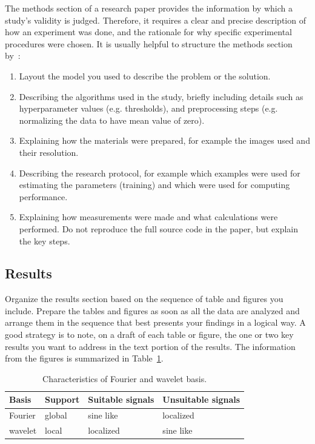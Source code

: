\documentclass[10pt,conference,compsocconf]{IEEEtran}
\begin{document}
The methods section of a research paper provides the information by
which a study's validity is judged.
Therefore, it requires a clear and precise description of how an
experiment was done, and the rationale
for why specific experimental procedures were chosen.
It is usually helpful to
structure the methods section by~\cite{kallet04methods}:
\begin{enumerate}
\item Layout the model you used to describe the problem or the solution.
\item Describing the algorithms used in the study, briefly including
  details such as hyperparameter values (e.g. thresholds), and
  preprocessing steps (e.g. normalizing the data to have mean value of
  zero).
\item Explaining how the materials were prepared, for example the
  images used and their resolution.
\item Describing the research protocol, for example which examples
  were used for estimating the parameters (training) and which were
  used for computing performance.
\item Explaining how measurements were made and what
  calculations were performed. Do not reproduce the full source code in
  the paper, but explain the key steps.
\end{enumerate}

\subsection{Results}

Organize the results section based on the sequence of table and
figures you include. Prepare the tables and figures as soon as all
the data are analyzed and arrange them in the sequence that best
presents your findings in a logical way. A good strategy is to note,
on a draft of each table or figure, the one or two key results you
want to address in the text portion of the results.
The information from the figures is
summarized in Table~\ref{tab:fourier-wavelet}.

\begin{table}[htbp]
  \centering
  \begin{tabular}[c]{|l||l|l|l|}
    \hline
    Basis&Support&Suitable signals&Unsuitable signals\\
    \hline
    Fourier&global&sine like&localized\\
    wavelet&local&localized&sine like\\
    \hline
  \end{tabular}
  \caption{Characteristics of Fourier and wavelet basis.}
  \label{tab:fourier-wavelet}
\end{table}
\end{document}
